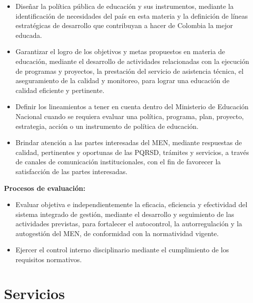 \begin{itemize}
	\item Diseñar la política pública de educación y sus instrumentos, mediante la identificación de necesidades del país en esta materia y la definición de líneas estratégicas de desarrollo que contribuyan a hacer de Colombia la mejor educada.
	\item Garantizar el logro de los objetivos y metas propuestos en materia de educación, mediante el desarrollo de actividades relacionadas con la ejecución de programas y proyectos, la prestación del servicio de asistencia técnica, el aseguramiento de la calidad y monitoreo, para lograr una educación de calidad eficiente y pertinente.
	\item Definir los lineamientos a tener en cuenta dentro del Ministerio de Educación Nacional cuando se requiera evaluar una política, programa, plan, proyecto, estrategia, acción o un instrumento de política de educación.
	\item Brindar atención a las partes interesadas del MEN, mediante respuestas de calidad, pertinentes y oportunas de las PQRSD, trámites y servicios, a través de canales de comunicación institucionales, con el fin de favorecer la satisfacción de las partes interesadas.
\end{itemize}

\textbf{Procesos de evaluación:}
\begin{itemize}
	\item Evaluar objetiva e independientemente la eficacia, eficiencia y efectividad del sistema integrado de gestión, mediante el desarrollo y seguimiento de las actividades previstas, para fortalecer el autocontrol, la autorregulación y la autogestión del MEN, de conformidad con la normatividad vigente.
	\item Ejercer el control interno disciplinario mediante el cumplimiento de los requisitos normativos.
\end{itemize}

\section{Servicios}

